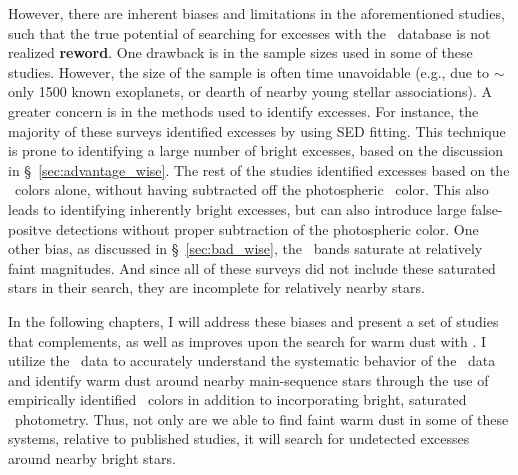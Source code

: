     However, there are inherent biases and limitations in the aforementioned studies, such that the true potential of searching for excesses with the \WS\ database is not realized \textbf{reword}. One drawback is in the sample sizes used in some of these studies. However, the size of the sample is often time unavoidable (e.g., due to $\sim$ only 1500 known exoplanets, or dearth of nearby young stellar associations). A greater concern is in the methods used to identify excesses. For instance, the majority of these surveys identified excesses by using SED fitting. This technique is prone to identifying a large number of bright excesses, based on the discussion in \S~\ref{sec:advantage_wise}. The rest of the studies identified excesses based on the \WS\ colors alone, without having subtracted off the photospheric \WS\ color. This also leads to identifying inherently bright excesses, but can also introduce large false-positve detections without proper subtraction of the photospheric color. One other bias, as discussed in \S~\ref{sec:bad_wise}, the \WS\ bands saturate at relatively faint magnitudes. And since all of these surveys did not include these saturated stars in their search, they are incomplete for relatively nearby stars. 
    
    In the following chapters, I will address these biases and present a set of studies that complements, as well as improves upon the search for warm dust with \WS. I utilize the \WS\ data to accurately understand the systematic behavior of the \WS\ data and identify warm dust around nearby main-sequence stars through the use of empirically identified \WS\ colors in addition to incorporating bright, saturated \WS\ photometry. Thus, not only are we able to find faint warm dust in some of these systems, relative to published studies, it will search for undetected excesses around nearby bright stars. 
    
    
    